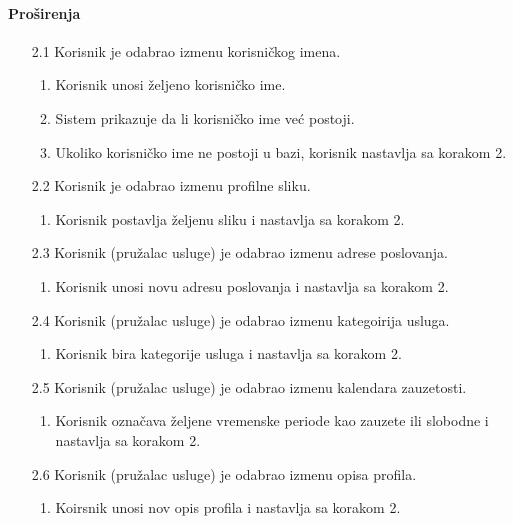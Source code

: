 \documentclass[a4paper,12pt]{report}
\begin{document}
    \paragraph*{Proširenja} 
    \begin{enumerate}
        \item[2.1] Korisnik je odabrao izmenu korisničkog imena.
        \begin{enumerate}[noitemsep,topsep=-8pt]
            \item Korisnik unosi željeno korisničko ime.
            \item Sistem prikazuje da li korisničko ime već postoji.
            \item Ukoliko korisničko ime ne postoji u bazi, korisnik nastavlja sa korakom 2.
        \end{enumerate}
    
        \item[2.2] Korisnik je odabrao izmenu profilne sliku.
        \begin{enumerate}[noitemsep,topsep=-8pt]
             \item Korisnik postavlja željenu sliku i nastavlja sa korakom 2.
        \end{enumerate}
        
        \item[2.3] Korisnik (pružalac usluge) je odabrao izmenu adrese poslovanja.
        \begin{enumerate}[noitemsep,topsep=-8pt]
        \item Korisnik unosi novu adresu poslovanja i nastavlja sa korakom 2.
        \end{enumerate}
    
        \item[2.4] Korisnik (pružalac usluge) je odabrao izmenu kategoirija usluga.
        \begin{enumerate}[noitemsep,topsep=-8pt]
            \item Korisnik bira kategorije usluga i nastavlja sa korakom 2.
        \end{enumerate}
        
        \item[2.5] Korisnik (pružalac usluge) je odabrao izmenu kalendara zauzetosti.
        \begin{enumerate}[noitemsep,topsep=-8pt]
            \item Korisnik označava željene vremenske periode kao zauzete ili slobodne i nastavlja sa korakom 2.
        \end{enumerate}
   
        \item[2.6] Korisnik (pružalac usluge) je odabrao izmenu opisa profila.
         \begin{enumerate}[noitemsep,topsep=-8pt]
        \item Koirsnik unosi nov opis profila i nastavlja sa korakom 2.
        \end{enumerate}
    \end{enumerate}
    
\end{document}
